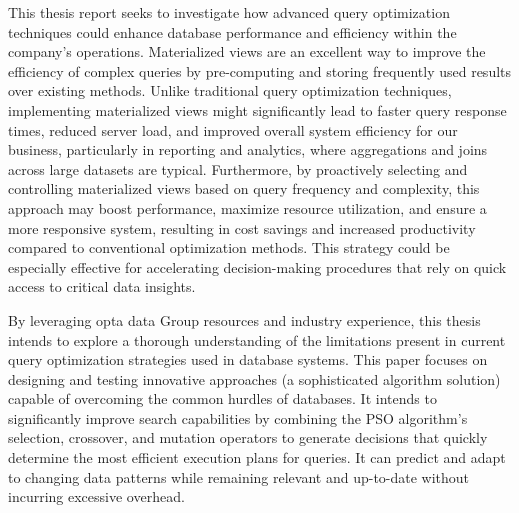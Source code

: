 This thesis report seeks to investigate how advanced query optimization techniques could enhance database performance and efficiency within the company's operations. Materialized views are an excellent way to improve the efficiency of complex queries by pre-computing and storing frequently used results over existing methods. Unlike traditional query optimization techniques, implementing materialized views might significantly lead to faster query response times, reduced server load, and improved overall system efficiency for our business, particularly in reporting and analytics, where aggregations and joins across large datasets are typical. Furthermore, by proactively selecting and controlling materialized views based on query frequency and complexity, this approach may boost performance, maximize resource utilization, and ensure a more responsive system, resulting in cost savings and increased productivity compared to conventional optimization methods. This strategy could be especially effective for accelerating decision-making procedures that rely on quick access to critical data insights.\vspace{.4cm}

By leveraging opta data Group resources and industry experience, this thesis intends to explore a thorough understanding of the limitations present in current query optimization strategies used in database systems. This paper focuses on designing and testing innovative approaches (a sophisticated algorithm solution) capable of overcoming the common hurdles of databases. It intends to significantly improve search capabilities by combining the PSO algorithm's selection, crossover, and mutation operators to generate decisions that quickly determine the most efficient execution plans for queries. It can predict and adapt to changing data patterns while remaining relevant and up-to-date without incurring excessive overhead.\vspace{.4cm}



